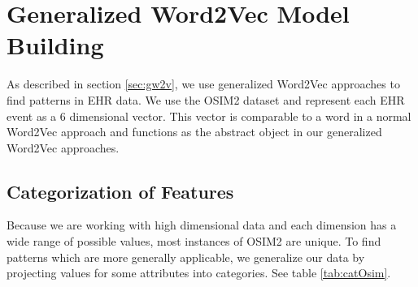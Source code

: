 \section{Generalized Word2Vec Model Building}
\label{sec:convertionClusters}

As described in section \ref{sec:gw2v}, we use generalized Word2Vec approaches to find patterns in EHR data. We use the OSIM2 dataset and represent each EHR event as a $6$ dimensional vector. This vector is comparable to a word in a normal Word2Vec approach and functions as the abstract object in our generalized Word2Vec approaches. 

\subsection{Categorization of Features}
\label{sec:categorizationImpl}

Because we are working with high dimensional data and each dimension has a wide range of possible values, most instances of OSIM2 are unique. To find patterns which are more generally applicable, we generalize our data by projecting values for some attributes into categories. See table \ref{tab:catOsim}. \\

